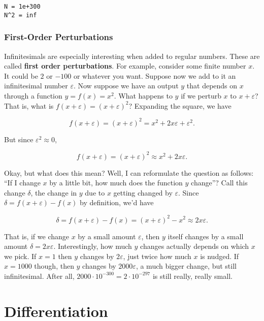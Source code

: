 \documentclass[
  letterpaper,
  DIV=11,
  numbers=noendperiod]{scrreprt}
\begin{document}
\begin{verbatim}
N = 1e+300
N^2 = inf
\end{verbatim}

\hypertarget{first-order-perturbations}{%
\subsubsection{First-Order
Perturbations}\label{first-order-perturbations}}

Infinitesimals are especially interesting when added to regular numbers.
These are called \textbf{first order perturbations}. For example,
consider some finite number \(x\). It could be \(2\) or \(-100\) or
whatever you want. Suppose now we add to it an infinitesimal number
\(\varepsilon\). Now suppose we have an output \(y\) that depends on
\(x\) through a function \(y=f(x)=x^2\). What happens to \(y\) if we
perturb \(x\) to \(x+\varepsilon\)? That is, what is
\(f(x + \varepsilon)=(x+\varepsilon)^2\)? Expanding the square, we have

\[f(x + \varepsilon) = (x + \varepsilon)^2 = x^2 + 2x\varepsilon + \varepsilon^2.\]

But since \(\varepsilon^2 \approx 0\),

\[f(x + \varepsilon) = (x + \varepsilon)^2 \approx x^2 + 2x\varepsilon.\]

Okay, but what does this mean? Well, I can reformulate the question as
follows: ``If I change \(x\) by a little bit, how much does the function
\(y\) change''? Call this change \(\delta\), the change in \(y\) due to
\(x\) getting changed by \(\varepsilon\). Since
\(\delta = f(x+\varepsilon) - f(x)\) by definition, we'd have

\[\delta = f(x+\varepsilon) - f(x) = (x+\varepsilon)^2 - x^2 \approx 2x\varepsilon.\]

That is, if we change \(x\) by a small amount \(\varepsilon\), then
\(y\) itself changes by a small amount \(\delta=2x\varepsilon\).
Interestingly, how much \(y\) changes actually depends on which \(x\) we
pick. If \(x=1\) then \(y\) changes by \(2\varepsilon\), just twice how
much \(x\) is nudged. If \(x=1000\) though, then \(y\) changes by
\(2000\varepsilon\), a much bigger change, but still infinitesimal.
After all, \(2000 \cdot 10^{-300} = 2 \cdot 10^{-297}\) is still really,
really small.

\hypertarget{differentiation}{%
\section{Differentiation}\label{differentiation}}
\end{document}
